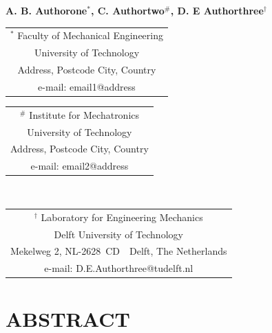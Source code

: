 \documentclass{bmd2016p}
\begin{document}
\begin{center}
\end{center}

\begin{center}
\normalsize{\bf{A. B. Authorone$^{*}$, C. Authortwo$^\#$, 
            D. E Authorthree$^\dag$}}
\end{center} 

\begin{center}
\begin{tabular}{c}
$^*$ Faculty of Mechanical Engineering\\
University of Technology\\
Address, Postcode City, Country\\
e-mail: email1@address\\
\end{tabular}
\begin{tabular}{c}
$^\#$ Institute for Mechatronics\\
 University of Technology\\
Address, Postcode City, Country\\
e-mail: email2@address\\
\end{tabular} \\ \vspace{2.5ex}

\begin{tabular}{c}
$^\dag$ Laboratory for Engineering Mechanics\\
 Delft University of Technology\\
 Mekelweg 2, NL-2628~CD~~Delft, The Netherlands\\
 e-mail: D.E.Authorthree@tudelft.nl\\
\end{tabular}
\end{center}


\section*{ABSTRACT}
\end{document}
